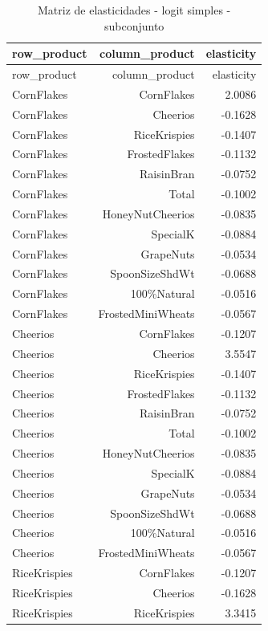 \begingroup
\scriptsize
\begin{longtable}{@{}lrr@{}}
\caption{Matriz de elasticidades - logit simples - subconjunto}\label{tab:elas-simple-subset}\\
\toprule
row\_product & column\_product & elasticity \\
\midrule
\endfirsthead
\toprule
row\_product & column\_product & elasticity \\
\midrule
\endhead
CornFlakes & CornFlakes & 2.0086 \\
CornFlakes & Cheerios & -0.1628 \\
CornFlakes & RiceKrispies & -0.1407 \\
CornFlakes & FrostedFlakes & -0.1132 \\
CornFlakes & RaisinBran & -0.0752 \\
CornFlakes & Total & -0.1002 \\
CornFlakes & HoneyNutCheerios & -0.0835 \\
CornFlakes & SpecialK & -0.0884 \\
CornFlakes & GrapeNuts & -0.0534 \\
CornFlakes & SpoonSizeShdWt & -0.0688 \\
CornFlakes & 100\%Natural & -0.0516 \\
CornFlakes & FrostedMiniWheats & -0.0567 \\
Cheerios & CornFlakes & -0.1207 \\
Cheerios & Cheerios & 3.5547 \\
Cheerios & RiceKrispies & -0.1407 \\
Cheerios & FrostedFlakes & -0.1132 \\
Cheerios & RaisinBran & -0.0752 \\
Cheerios & Total & -0.1002 \\
Cheerios & HoneyNutCheerios & -0.0835 \\
Cheerios & SpecialK & -0.0884 \\
Cheerios & GrapeNuts & -0.0534 \\
Cheerios & SpoonSizeShdWt & -0.0688 \\
Cheerios & 100\%Natural & -0.0516 \\
Cheerios & FrostedMiniWheats & -0.0567 \\
RiceKrispies & CornFlakes & -0.1207 \\
RiceKrispies & Cheerios & -0.1628 \\
RiceKrispies & RiceKrispies & 3.3415 \\

\end{longtable}
